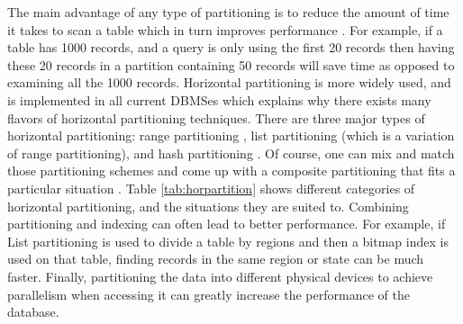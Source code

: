 \documentclass[12pt,a4paper]{article}
\begin{document}
The main advantage of any type of partitioning is to reduce the amount of time it takes to scan a table which in turn improves performance
\cite{lightstone2007physical}. For example, if a table has 1000 records, and a query is only using the first 20 records then having these 20 records in a
partition containing 50 records will save time as opposed to examining all the 1000 records. Horizontal partitioning is more widely used, and is implemented in
all current DBMSes \cite{mysqlpartitioning, sqlsrvpartitioning, sybasepartitioning, postgrepartitioning, oraclepartitioning, db2partitioning} which explains
why there exists many flavors of horizontal partitioning techniques. There are three major types of horizontal partitioning: range partitioning
\cite{dewitt1986gamma}, list partitioning \cite{lightstone2007physical} (which is a variation of range partitioning), and hash partitioning
\cite{lightstone2007physical}. Of course, one can mix and match those partitioning schemes and come up with a composite partitioning that fits a particular
situation \cite{lightstone2007physical}. Table \ref{tab:horpartition} shows different categories of horizontal partitioning, and the situations they are suited
to. Combining partitioning and indexing can often lead to better performance. For example, if List partitioning is used to divide a table by regions and then a
bitmap index is used on that table, finding records in the same region or state can be much faster. Finally, partitioning the data into different physical
devices to achieve parallelism when accessing it can greatly increase the performance of the database.
\end{document}
